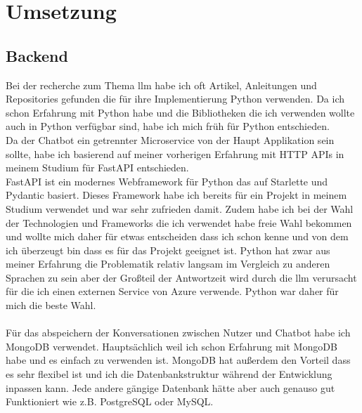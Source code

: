 \chapter{Umsetzung}\label{ch:umsetzung}
\section{Backend}\label{sec:umsetzung_backend}
Bei der recherche zum Thema \gls{llm} habe ich oft Artikel, Anleitungen und Repositories gefunden die für ihre Implementierung Python verwenden.
Da ich schon Erfahrung mit Python habe und die Bibliotheken die ich verwenden wollte auch in Python verfügbar sind, habe ich mich früh für Python entschieden.\\
Da der Chatbot ein getrennter Microservice von der Haupt Applikation sein sollte, habe ich basierend auf meiner vorherigen Erfahrung mit HTTP APIs in meinem Studium für FastAPI entschieden.\\
FastAPI ist ein modernes Webframework für Python das auf Starlette und Pydantic basiert. 
Dieses Framework habe ich bereits für ein Projekt in meinem Studium verwendet und war sehr zufrieden damit.
Zudem habe ich bei der Wahl der Technologien und Frameworks die ich verwendet habe freie Wahl bekommen und wollte
mich daher für etwas entscheiden dass ich schon kenne und von dem ich überzeugt bin dass es für das Projekt geeignet ist.
Python hat zwar aus meiner Erfahrung die Problematik relativ langsam im Vergleich zu anderen Sprachen zu sein aber der Großteil der Antwortzeit wird durch die \gls{llm} verursacht 
für die ich einen externen Service von Azure verwende. Python war daher für mich die beste Wahl.\\\\
Für das abspeichern der Konversationen zwischen Nutzer und Chatbot habe ich\\MongoDB verwendet. Hauptsächlich weil ich schon Erfahrung mit MongoDB habe und es einfach zu verwenden ist.
MongoDB hat außerdem den Vorteil dass es sehr flexibel ist und ich die Datenbankstruktur während der Entwicklung inpassen kann.
Jede andere gängige Datenbank hätte aber auch genauso gut Funktioniert wie z.B. PostgreSQL oder MySQL.\\


